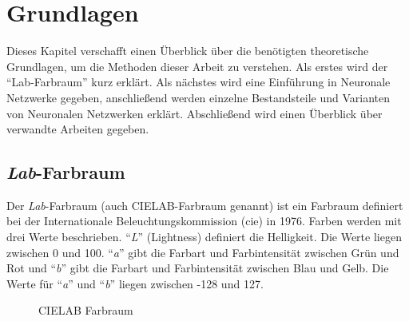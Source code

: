 \chapter{Grundlagen}
Dieses Kapitel verschafft einen Überblick über die benötigten theoretische Grundlagen, um die Methoden dieser Arbeit zu verstehen. Als
erstes wird der ``Lab-Farbraum'' kurz erklärt. Als nächstes wird eine Einführung in Neuronale Netzwerke gegeben, anschließend werden
einzelne Bestandsteile und Varianten von Neuronalen Netzwerken erklärt. Abschließend wird einen Überblick über verwandte Arbeiten gegeben.

\section{\textit{Lab}-Farbraum} 
Der \textit{Lab}-Farbraum (auch CIELAB-Farbraum genannt) ist ein Farbraum definiert bei der Internationale
Beleuchtungskommission (\gls{cie}) in 1976. Farben werden mit drei Werte beschrieben. ``\textit{L}'' (Lightness) definiert die Helligkeit.
Die Werte liegen zwischen 0 und 100. ``\textit{a}'' gibt die Farbart und Farbintensität zwischen Grün und Rot und ``\textit{b}'' gibt die
Farbart und Farbintensität zwischen Blau und Gelb. Die Werte für ``\textit{a}'' und ``\textit{b}'' liegen zwischen -128 und 127.

\begin{figure}[h]
  \caption{CIELAB Farbraum}
\end{figure}

